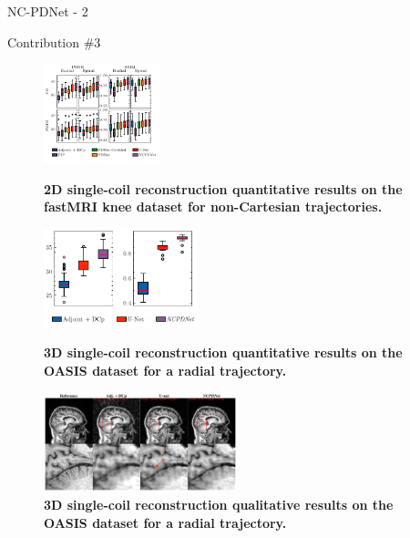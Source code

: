 \begin{frame}{NC-PDNet - 2}
    \begin{exampleblock}{Contribution \#3}
    \end{exampleblock}

    \begin{figure}
        \begin{overprint}
            \centering\includegraphics[width=0.3\textwidth]{Figures/dl_mri_figures/single_coil.pdf}\caption{\textbf{2D single-coil reconstruction quantitative results on the fastMRI knee dataset for non-Cartesian trajectories.}}
            \centering\includegraphics[width=0.4\textwidth]{Figures/dl_mri_figures/3d.pdf}\caption{\textbf{3D single-coil reconstruction quantitative results on the OASIS dataset for a radial trajectory.}}
            \centering\includegraphics[width=0.5\textwidth]{Figures/dl_mri_figures/quali_no_err_3d_af4_radial.pdf}\caption{\textbf{3D single-coil reconstruction qualitative results on the OASIS dataset for a radial trajectory.}}
        \end{overprint}
    \end{figure}
\end{frame}

